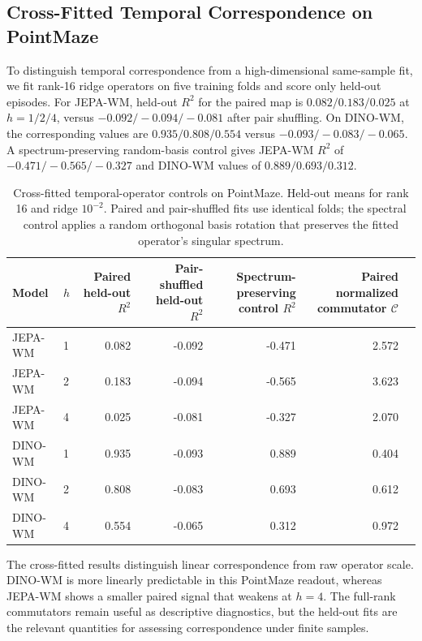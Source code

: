 \documentclass{article}
\begin{document}
\subsection{Cross-Fitted Temporal Correspondence on PointMaze}
\label{sec:supp-pointmaze-crossfit}

To distinguish temporal correspondence from a high-dimensional same-sample fit,
we fit rank-16 ridge operators on five training folds and score only held-out
episodes. For JEPA-WM, held-out $R^2$ for the paired map is
$0.082/0.183/0.025$ at $h=1/2/4$, versus
$-0.092/-0.094/-0.081$ after pair shuffling. On DINO-WM, the corresponding
values are $0.935/0.808/0.554$ versus $-0.093/-0.083/-0.065$. A
spectrum-preserving random-basis control gives JEPA-WM $R^2$ of
$-0.471/-0.565/-0.327$ and DINO-WM values of $0.889/0.693/0.312$.

\begin{table}[H]
\centering
\small
\setlength{\tabcolsep}{3pt}
\caption{Cross-fitted temporal-operator controls on PointMaze. Held-out means for rank 16 and ridge $10^{-2}$. Paired and pair-shuffled fits use identical folds; the spectral control applies a random orthogonal basis rotation that preserves the fitted operator's singular spectrum.}
\label{tab:supp-pointmaze-crossfit}
\begin{tabular}{llrrrrr}
\toprule
Model & $h$ & \shortstack{Paired\\held-out $R^2$} & \shortstack{Pair-shuffled\\held-out $R^2$} & \shortstack{Spectrum-preserving\\control $R^2$} & \shortstack{Paired normalized\\commutator $\mathcal C$} \\
\midrule
JEPA-WM & 1 & 0.082 & -0.092 & -0.471 & 2.572 \\
JEPA-WM & 2 & 0.183 & -0.094 & -0.565 & 3.623 \\
JEPA-WM & 4 & 0.025 & -0.081 & -0.327 & 2.070 \\
DINO-WM & 1 & 0.935 & -0.093 & 0.889 & 0.404 \\
DINO-WM & 2 & 0.808 & -0.083 & 0.693 & 0.612 \\
DINO-WM & 4 & 0.554 & -0.065 & 0.312 & 0.972 \\
\bottomrule
\end{tabular}
\end{table}

The cross-fitted results distinguish linear correspondence from raw operator
scale. DINO-WM is more linearly predictable in this PointMaze readout, whereas
JEPA-WM shows a smaller paired signal that weakens at $h=4$. The full-rank
commutators remain useful as descriptive diagnostics, but the held-out fits are
the relevant quantities for assessing correspondence under finite samples.
\end{document}
